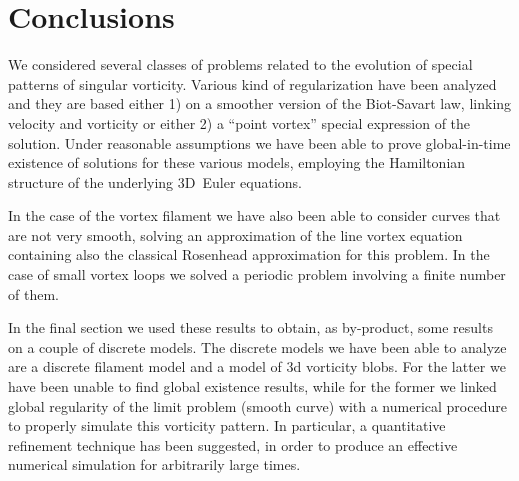 \documentclass[a4paper,11pt]{article}
\numberwithin{equation}{section}
\begin{document}
\section{Conclusions}
We considered several classes of problems related to the
evolution of special patterns of singular vorticity. Various kind
of regularization have been analyzed and they are based either 1) on a
smoother version of the Biot-Savart law, linking velocity and
vorticity or either 2) a ``point vortex'' special expression of the  
solution. Under reasonable assumptions we have been able to prove
global-in-time existence of solutions for these various models,
employing the Hamiltonian structure of the underlying 3D~Euler
equations. \par 
%
In the case of the vortex filament we have also been able to consider
curves that are not very smooth, solving an approximation of the line
vortex equation containing also the classical Rosenhead approximation
for this problem. In the case of small vortex loops we solved a periodic
problem involving a finite number of them.\par 
%
In the final section we used these results to obtain, as by-product,
some results on a couple of discrete models. The discrete models we
have been able to analyze are a discrete filament model and a model
of 3d vorticity blobs. For the latter we have been unable to find
global existence results, while for the former we linked global
regularity of the limit problem (smooth curve) with a numerical
procedure to properly simulate this vorticity pattern. In 
particular, a quantitative refinement technique has been suggested, in
order to produce an effective numerical simulation for arbitrarily
large times. 
\providecommand{\bysame}{\levaevmode\hbox to3em{\hrulefill}\thinspace}
\providecommand{\MR}{\relax\ifhmode\unskip\space\fi MR }
\providecommand{\MRhref}[2]{%
  \href{http://www.ams.org/mathscinet-getitem?mr=#1}{#2}
}
\providecommand{\href}[2]{#2}
\end{document}
